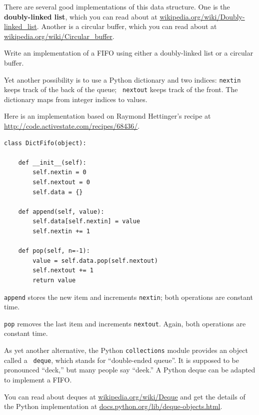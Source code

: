 \documentclass[10pt]{book}
\begin{document}
There are several good implementations of this data structure.
One is the {\bf doubly-linked list}, which 
you can read about at \url{wikipedia.org/wiki/Doubly-linked_list}.
Another is a circular buffer, which you can read about at
\url{wikipedia.org/wiki/Circular_buffer}.

\begin{ex}

Write an implementation of a FIFO using either a doubly-linked
list or a circular buffer.

\end{ex}

Yet another possibility is to use a Python dictionary and
two indices: {\tt nextin} keeps track of the back of the queue; {\tt
  nextout} keeps track of the front.  The dictionary maps from
integer indices to values.

Here is an implementation based on Raymond Hettinger's recipe
at \url{http://code.activestate.com/recipes/68436/}.

\begin{verbatim}
class DictFifo(object):

    def __init__(self):
        self.nextin = 0
        self.nextout = 0
        self.data = {}

    def append(self, value):
        self.data[self.nextin] = value
        self.nextin += 1

    def pop(self, n=-1):
        value = self.data.pop(self.nextout)
        self.nextout += 1
        return value
\end{verbatim}

{\tt append} stores the new item and increments {\tt nextin};
both operations are constant time.

{\tt pop} removes the last item and increments {\tt nextout}.  Again,
both operations are constant time.

As yet another alternative,
the Python {\tt collections} module provides an object called a {\tt
  deque}, which stands for ``double-ended queue''.  It is supposed to
be pronounced ``deck,'' but many people say ``deek.''  A Python deque
can be adapted to implement a FIFO.

You can read about deques at \url{wikipedia.org/wiki/Deque}
and get the details of the Python implementation at
\url{docs.python.org/lib/deque-objects.html}.
\end{document}
